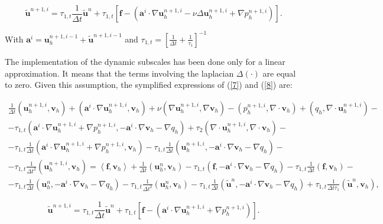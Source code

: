 \begin{equation}
\label{8}
\tilde{\mathbf{u}}^{n+1,i}=\tau_{1,t}\frac{1}{\Delta t}\tilde{\mathbf{u}}^n+\tau_{1,t}\left[\mathbf{f}-(\mathbf{a}^i\cdot\nabla\mathbf{u}_h^{n+1,i}-\nu\Delta\mathbf{u}_h^{n+1,i}+\nabla p_h^{n+1,i})\right].
\end{equation}

With $ \mathbf{a}^i=\mathbf{u}_h^{n+1,i-1}+\tilde{\mathbf{u}}^{n+1,i-1} $ and $ \tau_{1,t}=\left[\frac{1}{\Delta t}+\frac{1}{\tau_1}\right]^{-1} $

The implementation of the dynamic subscales has been done only for a linear approximation. It means that the terms involving the laplacian $ \Delta(\cdot) $ are equal to zero. Given this assumption, the symplified expressions of (\ref{7}) and (\ref{8}) are:

\begin{eqnarray}
\label{9}
\frac{1}{\Delta t}(\mathbf{u}_h^{n+1,i},\mathbf{v}_h)+(\mathbf{a}^i\cdot\nabla\mathbf{u}_h^{n+1,i},\mathbf{v}_h)+\nu(\nabla\mathbf{u}_h^{n+1,i},\nabla\mathbf{v}_h)-(p_h^{n+1,i},\nabla\cdot\mathbf{v}_h)+(q_h,\nabla\cdot\mathbf{u}_h^{n+1,i})-\\\nonumber
-\tau_{1,t}(\mathbf{a}^i\cdot\nabla\mathbf{u}_h^{n+1,i}+\nabla p_h^{n+1,i},-\mathbf{a}^i\cdot\nabla\mathbf{v}_h-\nabla q_h)+\tau_2(\nabla\cdot\mathbf{u}_h^{n+1,i},\nabla\cdot\mathbf{v}_h)-\\\nonumber
-\tau_{1,t}\frac{1}{\Delta t}(\mathbf{a}^i\cdot\nabla\mathbf{u}_h^{n+1,i}+\nabla p_h^{n+1,i},\mathbf{v}_h)-\tau_{1,t}\frac{1}{\Delta t}(\mathbf{u}_h^{n+1,i},-\mathbf{a}^i\cdot\nabla\mathbf{v}_h-\nabla q_h)-\\\nonumber
-\tau_{1,t}\frac{1}{\Delta t^2}(\mathbf{u}_h^{n+1,i},\mathbf{v}_h)=\left<\mathbf{f},\mathbf{v}_h\right>+\frac{1}{\Delta t}(\mathbf{u}_h^n,\mathbf{v}_h)-\tau_{1,t}(\mathbf{f},-\mathbf{a}^i\cdot\nabla\mathbf{v}_h-\nabla q_h)-\tau_{1,t}\frac{1}{\Delta t}(\mathbf{f},\mathbf{v}_h)-\\\nonumber
-\tau_{1,t}\frac{1}{\Delta t}(\mathbf{u}_h^n,-\mathbf{a}^i\cdot\nabla\mathbf{v}_h-\nabla q_h)-\tau_{1,t}\frac{1}{\Delta t^2}(\mathbf{u}_h^n,\mathbf{v}_h)-\tau_{1,t}\frac{1}{\Delta t}(\tilde{\mathbf{u}}^n,-\mathbf{a}^i\cdot\nabla\mathbf{v}_h-\nabla q_h)+\tau_{1,t}\frac{1}{\Delta t\tau_1}(\tilde{\mathbf{u}}^n,\mathbf{v}_h),
\end{eqnarray}

\begin{equation}
\label{10}
\tilde{\mathbf{u}}^{n+1,i}=\tau_{1,t}\frac{1}{\Delta t}\tilde{\mathbf{u}}^n+\tau_{1,t}\left[\mathbf{f}-(\mathbf{a}^i\cdot\nabla\mathbf{u}_h^{n+1,i}+\nabla p_h^{n+1,i})\right].
\end{equation}

